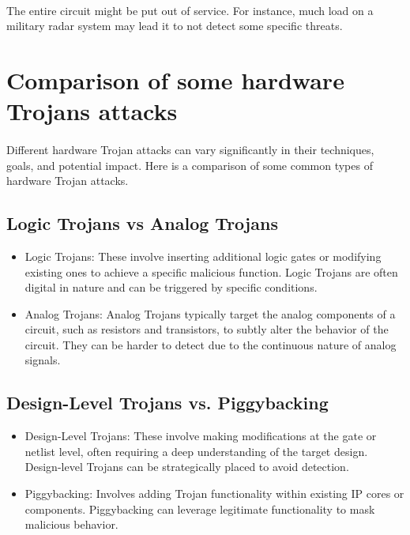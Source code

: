 \paragraph*{}
 The entire circuit might be put out of service. For instance, much load on a military radar system may lead it to not detect some specific threats.
 
 \section{Comparison of some hardware Trojans attacks}
 \paragraph*{}
 Different hardware Trojan attacks can vary significantly in their techniques, goals, and potential impact. Here is a comparison of some common types of hardware Trojan attacks.
 
 \subsection{Logic Trojans vs Analog Trojans}
 \begin{itemize}
 	\item Logic Trojans: These involve inserting additional logic gates or modifying existing ones to achieve a specific malicious function. Logic Trojans are often digital in nature and can be triggered by specific conditions.
 	\item Analog Trojans: Analog Trojans typically target the analog components of a circuit, such as resistors and transistors, to subtly alter the behavior of the circuit. They can be harder to detect due to the continuous nature of analog signals.
 \end{itemize}
 \subsection{Design-Level Trojans vs. Piggybacking}
 \begin{itemize}
 	\item Design-Level Trojans: These involve making modifications at the gate or netlist level, often requiring a deep understanding of the target design. Design-level Trojans can be strategically placed to avoid detection.
 	\item Piggybacking: Involves adding Trojan functionality within existing IP cores or components. Piggybacking can leverage legitimate functionality to mask malicious behavior.
 \end{itemize}
